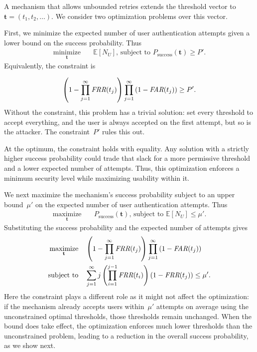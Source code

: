 \documentclass[conference,compsoc]{IEEEtran}
\begin{document}
A mechanism that allows unbounded retries extends the threshold vector to~$\mathbf{t}=(t_1,t_2,\ldots)$. We consider two optimization problems over this vector.

First, we minimize the expected number of user authentication attempts given a lower bound on the success probability. Thus
\begin{equation*}
\begin{aligned}
\underset{\mathbf{t}}{\operatorname{minimize}}
\quad&
\mathbb{E}[N_U]
\text{, subject to }
P_{\mathrm{success}}(\mathbf{t})
\geq
P'.
\end{aligned}
\end{equation*}
Equivalently, the constraint is

\begin{equation*}
\left(
1-
\prod_{j=1}^{\infty}\textit{FRR}(t_j)
\right)
\prod_{j=1}^{\infty}
\left(1-\textit{FAR}(t_j)\right)
\geq
P'.
\end{equation*}
Without the constraint, this problem has a trivial solution: set every threshold to accept everything, and the user is always accepted on the first attempt, but so is the attacker. The constraint~$P'$ rules this out. 

At the optimum, the constraint holds with equality. Any solution with a strictly higher success probability could trade that slack for a more permissive threshold and a lower expected number of attempts. Thus, this optimization enforces a minimum security level while maximizing usability within it. 

We next maximize the mechanism's success probability subject to an upper bound~$\mu'$ on the expected number of user authentication attempts. Thus
\begin{equation*}
\begin{aligned}
\underset{\mathbf{t}}{\operatorname{maximize}}
\quad&
P_{\mathrm{success}}(\mathbf{t})
\text{, subject to }
\mathbb{E}[N_U]
\leq \mu'.
\end{aligned}
\end{equation*}
Substituting the success probability and the expected number of attempts gives
\begin{equation*}
\begin{aligned}
\underset{\mathbf{t}}{\operatorname{maximize}}
\quad&
\left(
1-\prod_{j=1}^{\infty}\textit{FRR}(t_j)
\right)
\prod_{j=1}^{\infty}\left(1-\textit{FAR}(t_j)\right)
\\
\text{subject to}
\quad&
\sum_{j=1}^{\infty}
j\left(\prod_{i=1}^{j-1}\textit{FRR}(t_i)\right)
\left(1-\textit{FRR}(t_j)\right)
\leq \mu'.
\end{aligned}
\end{equation*}
Here the constraint plays a different role as it might not affect the optimization: if the mechanism already accepts users within~$\mu'$ attempts on average using the unconstrained optimal thresholds, those thresholds remain unchanged. When the bound does take effect, the optimization enforces much lower thresholds than the unconstrained problem, leading to a reduction in the overall success probability, as we show next.
\end{document}
